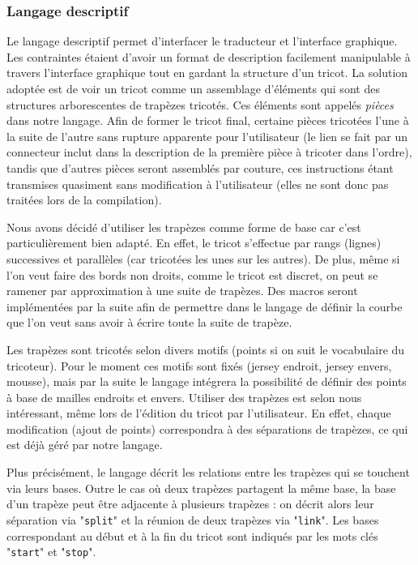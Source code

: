 \documentclass{article}
\begin{document}


\subsubsection{Langage descriptif}

Le langage descriptif permet d'interfacer le traducteur et l'interface graphique. Les contraintes étaient d'avoir un format de description facilement manipulable à travers l'interface graphique tout en gardant la structure d'un tricot. La solution adoptée est de voir un tricot comme un assemblage d'éléments qui sont des structures arborescentes de trapèzes tricotés. Ces éléments sont appelés \emph{pièces} dans notre langage. Afin de former le tricot final, certaine pièces tricotées l'une à la suite de l'autre sans rupture apparente pour l'utilisateur (le lien se fait par un connecteur inclut dans la description de la première pièce à tricoter dans l'ordre), tandis que d'autres pièces seront assemblés par couture, ces instructions étant transmises quasiment sans modification à l'utilisateur (elles ne sont donc pas traitées lors de la compilation).

Nous avons décidé d'utiliser les trapèzes comme forme de base car c'est particulièrement bien adapté. En effet, le tricot s'effectue par rangs (lignes) successives et parallèles (car tricotées les unes sur les autres). De plus, même si l'on veut faire des bords non droits, comme le tricot est discret, on peut se ramener par approximation à une suite de trapèzes. Des macros seront implémentées par la suite afin de permettre dans le langage de définir la courbe que l'on veut sans avoir à écrire toute la suite de trapèze.

Les trapèzes sont tricotés selon divers motifs (points si on suit le vocabulaire du tricoteur). Pour le moment ces motifs sont fixés (jersey endroit, jersey envers, mousse), mais par la suite le langage intégrera la possibilité de définir des points à base de mailles endroits et envers. Utiliser des trapèzes est selon nous intéressant, même lors de l'édition du tricot par l'utilisateur. En effet, chaque modification (ajout de points) correspondra à des séparations de trapèzes, ce qui est déjà géré par notre langage.

Plus précisément, le langage décrit les relations entre les trapèzes qui se touchent via leurs bases. Outre le cas où deux trapèzes partagent la même base, la base d'un trapèze peut être adjacente à plusieurs trapèzes : on décrit alors leur séparation via "\texttt{split}" et la réunion de deux trapèzes via "\texttt{link}". Les bases correspondant au début et à la fin du tricot sont indiqués par les mots clés "\texttt{start}" et "\texttt{stop}".
\end{document}
